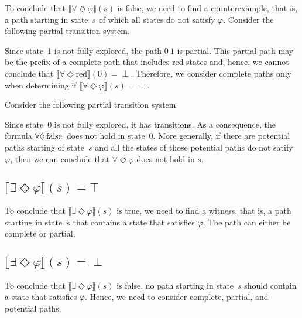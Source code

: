 \documentclass[12pt]{article}
\newcommand{\eventually}{\Diamond}
\newcommand{\FALSE}{\mbox{\lstinline{false}}}
\theoremstyle{definition}
\newcommand{\satisfaction}[1]{\llbracket #1 \rrbracket}
\newenvironment{franck}{\color{red}}{\color{black}}
\begin{document}
\begin{franck}
To conclude that $\satisfaction{\forall \eventually \varphi}(s)$ is false, we need to find a counterexample, that is, a path starting in state~$s$ of which all states do not satisfy $\varphi$.  Consider the following partial transition system.
\begin{center}
\end{center}
Since state~1 is not fully explored, the path $0\ 1$ is partial.  This partial path may be the prefix of a complete path that includes red states and, hence, we cannot conclude that $\satisfaction{\forall \eventually \mbox{red}}(0) = \perp$.  Therefore, we consider complete paths only when determining if $\satisfaction{\forall \eventually \varphi}(s) = \perp$.

Consider the following partial transition system.
\begin{center}
\end{center}
Since state~0 is not fully explored, it has transitions.  As a consequence, the formula $\forall \eventually \FALSE$ does not hold in state~0.  More generally, if there are potential paths starting of state~$s$ and all the states of those potential paths do not satify $\varphi$, then we can conclude that $\forall \eventually \varphi$ does not hold in $s$.

\subsection*{$\satisfaction{\exists \eventually \varphi}(s) = \top$}

To conclude that $\satisfaction{\exists \eventually \varphi}(s)$ is true, we need to find a witness, that is, a path starting in state~$s$ that contains a state that satisfies $\varphi$.  The path can either be complete or partial.

\subsection*{$\satisfaction{\exists \eventually \varphi}(s) = \perp$}

To conclude that $\satisfaction{\exists \eventually \varphi}(s)$ is false, no path starting in state~$s$ should contain a state that satisfies $\varphi$.  Hence, we need to consider complete, partial, and potential paths.
\end{franck}
\end{document}

